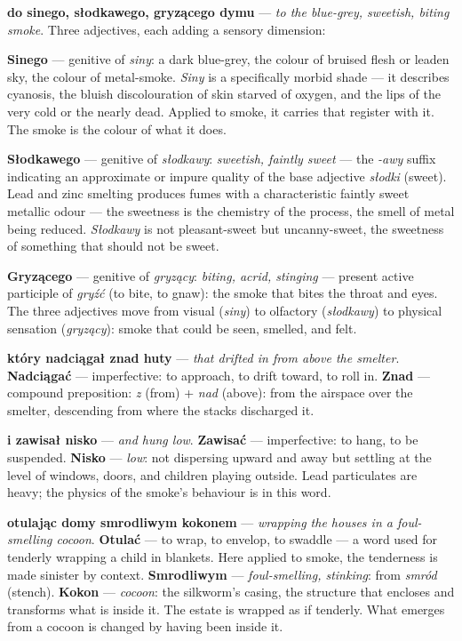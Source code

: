 \textbf{do sinego, słodkawego, gryzącego dymu} ---
\textit{to the blue-grey, sweetish, biting smoke}.
Three adjectives, each adding a sensory dimension:

\textbf{Sinego} --- genitive of \textit{siny}:
a dark blue-grey, the colour of bruised flesh or
leaden sky, the colour of metal-smoke. \textit{Siny}
is a specifically morbid shade --- it describes
cyanosis, the bluish discolouration of skin starved
of oxygen, and the lips of the very cold or the
nearly dead. Applied to smoke, it carries that
register with it. The smoke is the colour of what
it does.

\textbf{Słodkawego} --- genitive of \textit{słodkawy}:
\textit{sweetish, faintly sweet} --- the \textit{-awy}
suffix indicating an approximate or impure quality
of the base adjective \textit{słodki} (sweet). Lead
and zinc smelting produces fumes with a characteristic
faintly sweet metallic odour --- the sweetness is
the chemistry of the process, the smell of metal
being reduced. \textit{Słodkawy} is not
pleasant-sweet but uncanny-sweet, the sweetness
of something that should not be sweet.

\textbf{Gryzącego} --- genitive of \textit{gryzący}:
\textit{biting, acrid, stinging} --- present active
participle of \textit{gryźć} (to bite, to gnaw):
the smoke that bites the throat and eyes. The three
adjectives move from visual (\textit{siny}) to
olfactory (\textit{słodkawy}) to physical sensation
(\textit{gryzący}): smoke that could be seen,
smelled, and felt.

\textbf{który nadciągał znad huty} --- \textit{that
drifted in from above the smelter}. \textbf{Nadciągać}
--- imperfective: to approach, to drift toward, to
roll in. \textbf{Znad} --- compound preposition:
\textit{z} (from) + \textit{nad} (above): from the
airspace over the smelter, descending from where
the stacks discharged it.

\textbf{i zawisał nisko} --- \textit{and hung low}.
\textbf{Zawisać} --- imperfective: to hang, to be
suspended. \textbf{Nisko} --- \textit{low}: not
dispersing upward and away but settling at the
level of windows, doors, and children playing
outside. Lead particulates are heavy; the physics
of the smoke's behaviour is in this word.

\textbf{otulając domy smrodliwym kokonem} ---
\textit{wrapping the houses in a foul-smelling
cocoon}. \textbf{Otulać} --- to wrap, to envelop,
to swaddle --- a word used for tenderly wrapping
a child in blankets. Here applied to smoke, the
tenderness is made sinister by context.
\textbf{Smrodliwym} --- \textit{foul-smelling,
stinking}: from \textit{smród} (stench).
\textbf{Kokon} --- \textit{cocoon}: the silkworm's
casing, the structure that encloses and transforms
what is inside it. The estate is wrapped as if
tenderly. What emerges from a cocoon is changed
by having been inside it.


